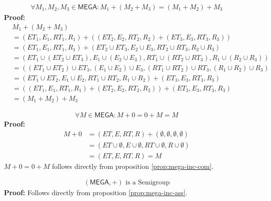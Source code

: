 \documentclass[runningheads,a4paper]{llncs}
\newcommand{\MEGA}{\mathsf{MEGA}}
\begin{document}
\begin{proposition}
\label{prop:mega-inc-ass}
\begin{align}
\forall M_1,M_2,M_3 \in \MEGA : M_1 + (M_2 + M_3) = (M_1 + M_2) + M_3
\end{align}
\textbf{Proof:}
\begin{equation}
\begin{split}
& M_1 + (M_2 + M_3)
\\ & = (ET_1,E_1,RT_1,R_1) + ((ET_2,E_2,RT_2,R_2) + (ET_3,E_3,RT_3,R_3))
\\ & = (ET_1,E_1,RT_1,R_1) + (ET_2 \cup ET_3, E_2 \cup E_3, RT_2 \cup RT_3, R_2 \cup R_3)
\\ & = (ET_1 \cup (ET_2 \cup ET_3), E_1 \cup (E_2 \cup E_3),RT_1 \cup (RT_2 \cup RT_3), R_1 \cup (R_2 \cup R_3))
\\ & = ((ET_1 \cup ET_2) \cup ET_3, (E_1 \cup E_2) \cup E_3,(RT_1 \cup RT_2) \cup RT_3, (R_1 \cup R_2) \cup R_3)
\\ & = (ET_1 \cup ET_2, E_1 \cup E_2, RT_1 \cup RT_2, R_1 \cup R_2) + (ET_3,E_3,RT_3,R_3)
\\ & = ((ET_1,E_1,RT_1,R_1) + (ET_2,E_2,RT_2,R_2)) + (ET_3,E_3,RT_3,R_3)
\\ & = (M_1 + M_2) + M_3
\end{split}
\end{equation}
\end{proposition}

\begin{proposition}
\label{prop:mega-inc-zero}
\begin{align}
\forall M \in \MEGA : M + 0 = 0 + M = M
\end{align}
\textbf{Proof:}
\begin{equation}
\begin{split}
M + 0
& = (ET,E,RT,R) + (\emptyset,\emptyset,\emptyset,\emptyset)
\\ & = (ET \cup \emptyset,E \cup \emptyset,RT \cup \emptyset,R \cup \emptyset)
\\ & = (ET,E,RT,R) = M
\end{split}
\end{equation}
$M + 0 = 0 + M$ follows directly from proposition \ref{prop:mega-inc-com}.
\end{proposition}

\begin{proposition}
\label{prop:mega-inc-semigroup}
\begin{align}
(\MEGA,+) \text{ is a Semigroup}
\end{align}
\textbf{Proof:}
Follows directly from proposition \ref{prop:mega-inc-ass}.
\end{proposition}
\end{document}
